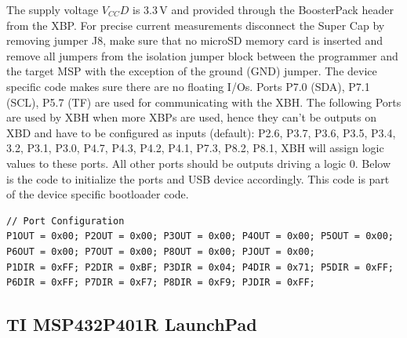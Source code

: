 \documentclass[twoside,11pt]{cergdoc}
\begin{document}
\noindent The supply voltage $V_{CC}D$ is 3.3\,V and provided through the BoosterPack header 
from the XBP.
For precise current measurements 
disconnect the Super Cap by removing jumper J8, make sure that no microSD 
memory card is inserted and
remove all jumpers from the isolation jumper block 
between the programmer and the target MSP with the exception of the ground (GND) jumper. 
The device specific code makes sure there are no floating I/Os. 
Ports P7.0 (SDA), P7.1 (SCL), P5.7 (TF) are used for communicating with the XBH.
The following Ports are used by XBH when more XBPs are used, hence they can't be outputs on XBD
and have to be configured as inputs (default): 
P2.6,
P3.7, P3.6, P3.5, P3.4, 3.2, P3.1, P3.0,
P4.7, P4.3, P4.2, P4.1,
P7.3,
P8.2, P8.1,
XBH will assign logic values to these ports.
All other ports should be outputs driving a logic 0. 
Below is the code to initialize the ports and USB device
accordingly. 
This code is part of the device specific bootloader code.

{\small
\begin{lstlisting}
// Port Configuration 
P1OUT = 0x00; P2OUT = 0x00; P3OUT = 0x00; P4OUT = 0x00; P5OUT = 0x00;
P6OUT = 0x00; P7OUT = 0x00; P8OUT = 0x00; PJOUT = 0x00;
P1DIR = 0xFF; P2DIR = 0xBF; P3DIR = 0x04; P4DIR = 0x71; P5DIR = 0xFF;
P6DIR = 0xFF; P7DIR = 0xF7; P8DIR = 0xF9; PJDIR = 0xFF;
\end{lstlisting}
}


%
%

\subsection{TI MSP432P401R LaunchPad\texttrademark}
\end{document}
